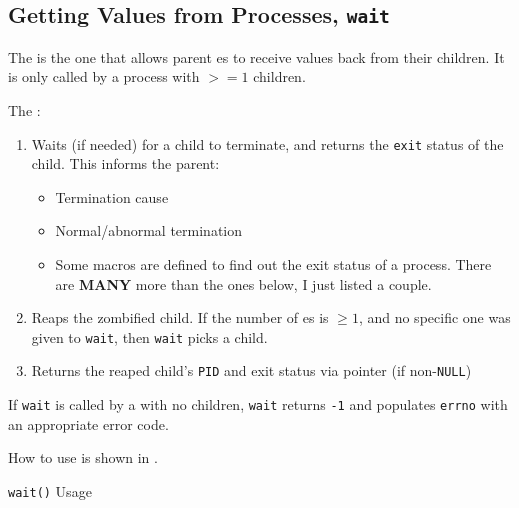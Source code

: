 \subsection{Getting Values from Processes, \texttt{wait}}\label{subsec:Values_from_Processes-wait}
The   is the one that allows parent es to receive values back from their children.
It is only called by a process with $>= 1$ children.

The  :
\begin{enumerate}[noitemsep]
\item Waits (if needed) for a child to terminate, and returns the \texttt{exit} status of the child.
  This informs the parent:
  \begin{itemize}[noitemsep]
  \item Termination cause
  \item Normal/abnormal termination
  \item Some macros are defined to find out the exit status of a process.
    There are \textbf{MANY} more than the ones below, I just listed a couple.
  \end{itemize}

\item Reaps the zombified child.
  If the number of es is $\geq 1$, and no specific one was given to \texttt{wait}, then \texttt{wait} picks a child.
\item Returns the reaped child's \texttt{PID} and exit status via pointer (if non-\texttt{NULL})
\end{enumerate}

If \texttt{wait} is called by a  with no children, \texttt{wait} returns \texttt{-1} and populates \texttt{errno} with an appropriate error code.

How to use  is shown in .

\begin{listing}[h!tbp]
\caption{\texttt{wait()} Usage}
\label{lst:wait_Usage}
\end{listing}



